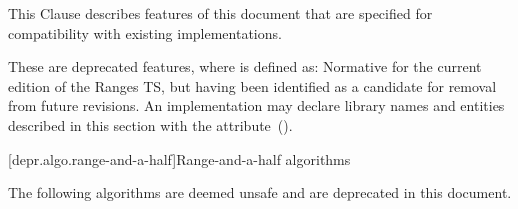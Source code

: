 
\pnum
This Clause describes features of this document that are specified for compatibility with
existing implementations.

\pnum
These are deprecated features, where
is defined as:
Normative for the current edition of the Ranges TS,
but having been identified as a candidate for removal from future revisions.
An implementation may declare library names and entities described in this section with the
 attribute~().

[depr.algo.range-and-a-half]{Range-and-a-half algorithms}

\pnum
The following algorithms are deemed unsafe and are deprecated in this document.

